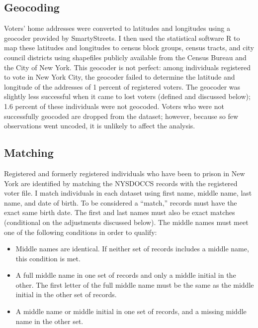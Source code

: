 \documentclass[12pt,]{article}
\providecommand{\tightlist}{%
  \setlength{\itemsep}{0pt}\setlength{\parskip}{0pt}}
\begin{document}
\hypertarget{geocoding}{%
\subsection*{Geocoding}\label{geocoding}}

Voters' home addresses were converted to latitudes and longitudes using a geocoder provided by SmartyStreets. I then used the statistical software R to map these latitudes and longitudes to census block groups, census tracts, and city council districts using shapefiles publicly available from the Census Bureau and the City of New York. This geocoder is not perfect: among individuals registered to vote in New York City, the geocoder failed to determine the latitude and longitude of the addresses of 1 percent of registered voters. The geocoder was slightly less successful when it came to lost voters (defined and discussed below); 1.6 percent of these individuals were not geocoded. Voters who were not successfully geocoded are dropped from the dataset; however, because so few observations went uncoded, it is unlikely to affect the analysis.

\hypertarget{matching}{%
\subsection*{Matching}\label{matching}}

Registered and formerly registered individuals who have been to prison in New York are identified by matching the NYSDOCCS records with the registered voter file. I match individuals in each dataset using first name, middle name, last name, and date of birth. To be considered a ``match,'' records must have the exact same birth date. The first and last names must also be exact matches (conditional on the adjustments discussed below). The middle names must meet one of the following conditions in order to qualify:

\begin{itemize}
\tightlist
\item
  Middle names are identical. If neither set of records includes a middle name, this condition is met.
\item
  A full middle name in one set of records and only a middle initial in the other. The first letter of the full middle name must be the same as the middle initial in the other set of records.
\item
  A middle name or middle initial in one set of records, and a missing middle name in the other set.
\end{itemize}
\end{document}
